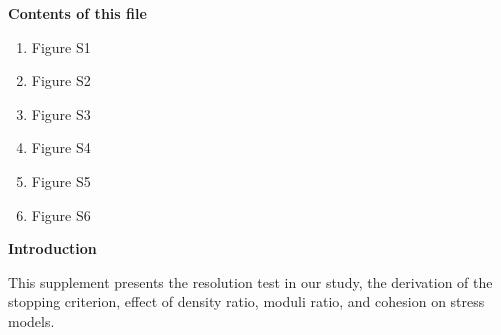 \documentclass[draft,jgrga]{agutexSI2019}
\begin{document}
\begin{article}

%
%



\noindent\textbf{Contents of this file}
\begin{enumerate}
\item Figure S1
\item Figure S2
\item Figure S3
\item Figure S4
\item Figure S5
\item Figure S6
\end{enumerate}



\vspace{10mm} %

\noindent\textbf{Introduction}

This supplement presents the resolution test in our study, the derivation of the stopping criterion, effect of density ratio, moduli ratio, and cohesion on stress models.

\vspace{10mm} %


\end{article}
\end{document}
